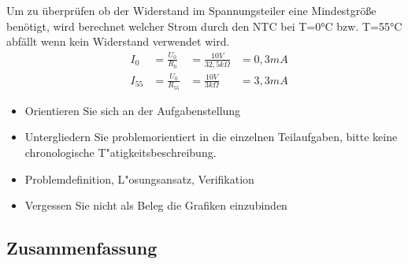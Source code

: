 Um zu überprüfen ob der Widerstand im Spannungsteiler eine Mindestgröße benötigt, wird berechnet welcher Strom durch den NTC bei T=0°C bzw. T=55°C abfällt wenn kein Widerstand verwendet wird.\\

\begin{align}
&I_0 &=\frac{U_0}{R_0}&=\frac{10V}{32,5k\Omega}&=0,3mA
\\&I_{55} &=\frac{U_0}{R_{55}}&=\frac{10V}{3k\Omega}&=3,3mA
\end{align}

\begin{itemize}
	\item Orientieren Sie sich an der Aufgabenstellung
	\item Untergliedern Sie problemorientiert in die einzelnen Teilaufgaben, bitte keine chronologische T"atigkeitsbeschreibung.
	\item Problemdefinition, L"osungsansatz, Verifikation
	\item Vergessen Sie nicht als Beleg die Grafiken einzubinden
\end{itemize}
\subsection{Zusammenfassung}